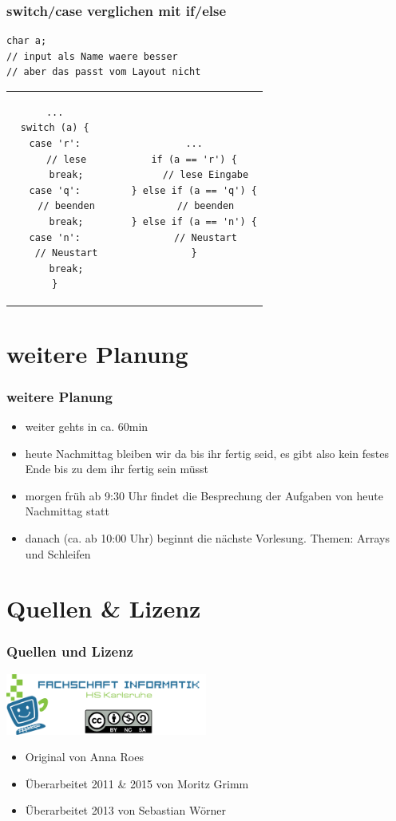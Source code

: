 \documentclass[final]{beamer}
\begin{document}
\begin{frame}[containsverbatim]
\frametitle{switch/case verglichen mit if/else}
	\begin{lstlisting}
char a;
// input als Name waere besser
// aber das passt vom Layout nicht
	\end{lstlisting}
	\begin{tabular}{c c c c}
	\begin{lstlisting}
...
switch (a) {
case 'r':
	// lese
	break;
case 'q':
	// beenden
	break;
case 'n':
	// Neustart
	break;
}
	\end{lstlisting}

& & &

	\begin{lstlisting}
...
if (a == 'r') {
	// lese Eingabe
} else if (a == 'q') {
	// beenden
} else if (a == 'n') {
	// Neustart
}
	\end{lstlisting}\\
	\end{tabular}
\end{frame}

\section{weitere Planung}
\begin{frame}
\frametitle{weitere Planung}
	\begin{itemize}
		\item{weiter gehts in ca. 60min}
		\item{heute Nachmittag bleiben wir da bis ihr fertig seid, es gibt also kein festes Ende bis zu dem ihr fertig sein müsst}
		\item{morgen früh ab 9:30 Uhr findet die Besprechung der Aufgaben von heute Nachmittag statt}
		\item{danach (ca. ab 10:00 Uhr) beginnt die nächste Vorlesung. Themen: Arrays und Schleifen}
	\end{itemize}
\end{frame}

\section{Quellen \& Lizenz}
\begin{frame}
	\frametitle{Quellen und Lizenz}
	\begin{center}
		\includegraphics[width=250px]{gfx/fsi}
	\end{center}
	\begin{itemize}
		\item{Original von Anna Roes}
		\item{Überarbeitet 2011 \& 2015 von Moritz Grimm}
		\item{Überarbeitet 2013 von Sebastian Wörner}
	\end{itemize}
\end{frame}
\end{document}
